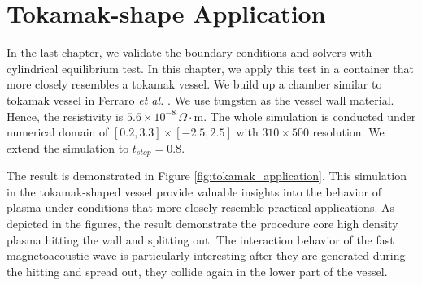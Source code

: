 
\chapter{Tokamak-shape Application}  %

\ifpdf
    \graphicspath{{Chapter9/Figs/Raster/}{Chapter9/Figs/PDF/}{Chapter9/Figs/}}
\else
    \graphicspath{{Chapter9/Figs/Vector/}{Chapter9/Figs/}}
\fi

\label{chapter 9}



In the last chapter, we validate the boundary conditions and solvers with cylindrical equilibrium test. In this chapter, we apply this test in a container that more closely resembles a tokamak vessel. We build up a chamber similar to tokamak vessel in Ferraro \textit{et al.} \cite{ferraro2016multi}. We use tungsten as the vessel wall material. Hence, the resistivity is $5.6 \times 10^{-8} \, \Omega \cdot \text{m}$. The whole simulation is conducted under numerical domain of $[0.2,3.3]\times[-2.5,2.5]$ with $310\times500$ resolution. We extend the simulation to $t_{stop}=0.8$. 

The result is demonstrated in Figure \ref{fig:tokamak_application}. This simulation in the tokamak-shaped vessel provide valuable insights into the behavior of plasma under conditions that more closely resemble practical applications. As depicted in the figures, the result demonstrate the procedure core high density plasma hitting the wall and splitting out. The interaction behavior of the fast magnetoacoustic wave is particularly interesting after they are generated during the hitting and spread out, they collide again in the lower part of the vessel.



